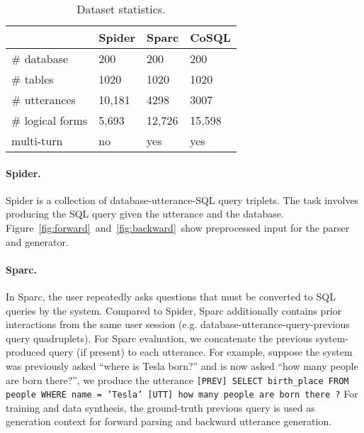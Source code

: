 \documentclass[11pt,a4paper]{article}
\begin{document}
\begin{table}[t]
\centering
\begin{tabularx}{\linewidth}{llll}
\toprule
                 & Spider & Sparc  & CoSQL  \\ \midrule
\# database      & 200    & 200    & 200    \\
\# tables        & 1020   & 1020   & 1020   \\
\# utterances    & 10,181 & 4298   & 3007   \\
\# logical forms & 5,693  & 12,726 & 15,598 \\
multi-turn       & no     & yes    & yes    \\ \bottomrule
\end{tabularx}
\vspace{-0.12in}
\caption{Dataset statistics.}
\vspace{-0.10in}
\label{tab:datasets}
\vspace{-0.15in}
\end{table}



\paragraph{Spider.}
Spider is a collection of database-utterance-SQL query triplets.
The task involves producing the SQL query given the utterance and the database.
Figure~\ref{fig:forward}~and~\ref{fig:backward}~show preprocessed input for the parser and generator.

\paragraph{Sparc.}
In Sparc, the user repeatedly asks questions that must be converted to SQL queries by the system.
Compared to Spider, Sparc additionally contains prior interactions from the same user session (e.g. database-utterance-query-previous query quadruplets).
For Sparc evaluation, we concatenate the previous system-produced query (if present) to each utterance.
For example, suppose the system was previously asked ``where is Tesla born?'' and is now asked ``how many people are born there?'', we produce the utterance \texttt{[PREV] SELECT birth\_place FROM people WHERE name = 'Tesla' [UTT] how many people are born there ?}
For training and data synthesis, the ground-truth previous query is used as generation context for forward parsing and backward utterance generation.
\end{document}

